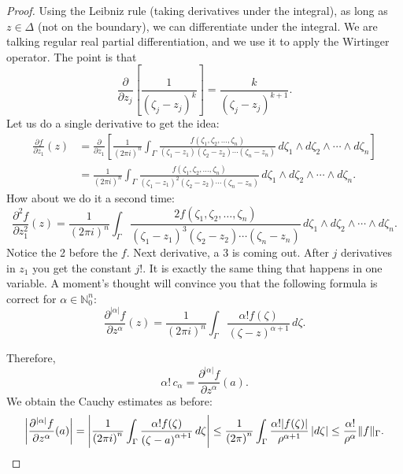 \documentclass[12pt,openany]{book}
\newcommand{\sabs}[1]{\lvert {#1} \rvert}
\newcommand{\snorm}[1]{\lVert {#1} \rVert}
\newcommand{\abs}[1]{\left\lvert {#1} \right\rvert}
\newcommand{\N}{{\mathbb{N}}}
\theoremstyle{plain}
\theoremstyle{remark}
\theoremstyle{definition}
\theoremstyle{exercise}
\theoremstyle{example}
\begin{document}
\begin{proof}
Using the Leibniz rule (taking derivatives under the integral),
as long as $z \in \Delta$ (not on the boundary),
we can differentiate under the integral.  We are talking regular real
partial differentiation, and we use it to apply the Wirtinger operator.
The point is that
\begin{equation*}
\frac{\partial}{\partial z_j} \left[
\frac{1}{{(\zeta_j-z_j)}^k} \right]
=
\frac{k}{{(\zeta_j-z_j)}^{k+1}} .
\end{equation*}
Let us do a single derivative to
get the idea:
\begin{equation*}
\begin{split}
\frac{\partial f}{\partial z_1}(z) &=
\frac{\partial}{\partial z_1} \left[
\frac{1}{{(2\pi i)}^n}
\int_{\Gamma}
\frac{f(\zeta_1,\zeta_2,\ldots,\zeta_n)}{(\zeta_1-z_1)(\zeta_2-z_2)\cdots(\zeta_n-z_n)}
\,
d \zeta_1 
\wedge
d \zeta_2
\wedge
\cdots
\wedge
d \zeta_n 
\right]
\\
& =
\frac{1}{{(2\pi i)}^n}
\int_{\Gamma}
\frac{f(\zeta_1,\zeta_2,\ldots,\zeta_n)}{{(\zeta_1-z_1)}^2(\zeta_2-z_2)\cdots(\zeta_n-z_n)}
\,
d \zeta_1 
\wedge
d \zeta_2
\wedge
\cdots
\wedge
d \zeta_n .
\end{split}
\end{equation*}
How about we do it a second time:
\begin{equation*}
\frac{\partial^2 f}{\partial z_1^2}(z) 
=
\frac{1}{{(2\pi i)}^n}
\int_{\Gamma}
\frac{2 f(\zeta_1,\zeta_2,\ldots,\zeta_n)}{{(\zeta_1-z_1)}^3(\zeta_2-z_2)\cdots(\zeta_n-z_n)}
\,
d \zeta_1 
\wedge
d \zeta_2
\wedge
\cdots
\wedge
d \zeta_n .
\end{equation*}
Notice the 2 before the $f$.  Next derivative, a 3 is coming out.  After $j$
derivatives in $z_1$ you get the constant $j!$.
It is exactly the same thing that happens in one variable.  A moment's
thought will convince you that the following formula is correct for
$\alpha \in \N_0^n$:
\begin{equation*}
\frac{\partial^{\sabs{\alpha}}f}{\partial z^\alpha} (z) =
\frac{1}{{(2\pi i)}^n}
\int_{\Gamma}
\frac{\alpha! f(\zeta)}{{(\zeta-z)}^{\alpha+1}}
\,
d \zeta .
\end{equation*}

Therefore,
\begin{equation*}
\alpha! \, c_\alpha = 
\frac{\partial^{\sabs{\alpha}} f}{\partial z^\alpha} (a) .
\end{equation*}
We obtain the Cauchy estimates as before:
\begin{equation*}
\abs{\frac{\partial^{\sabs{\alpha}}f}{\partial z^\alpha}(a)}
=
\abs{
\frac{1}{{(2\pi i)}^n}
\int_{\Gamma}
\frac{\alpha! f(\zeta)}{{(\zeta-a)}^{\alpha+1}}
\,
d \zeta }
\leq
\frac{1}{{(2\pi)}^n}
\int_{\Gamma}
\frac{\alpha! \sabs{f(\zeta)}}{\rho^{\alpha+1}}
\,
\sabs{d \zeta}
\leq
\frac{\alpha!}{\rho^\alpha}
\snorm{f}_\Gamma . \qedhere
\end{equation*}
\end{proof}
\end{document}
